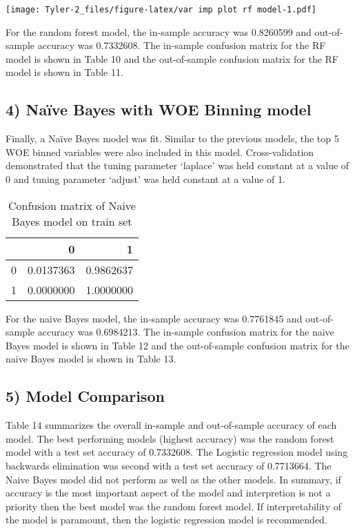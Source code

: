 \documentclass[12pt,]{article}
\begin{document}
\texttt{[image: Tyler-2\_files/figure-latex/var imp plot rf model-1.pdf]}

For the random forest model, the in-sample accuracy was 0.8260599 and
out-of-sample accuracy was 0.7332608. The in-sample confusion matrix for
the RF model is shown in Table 10 and the out-of-sample confusion matrix
for the RF model is shown in Table 11.

\pagebreak

\hypertarget{naive-bayes-with-woe-binning-model}{%
\subsection{4) Naïve Bayes with WOE Binning
model}\label{naive-bayes-with-woe-binning-model}}

Finally, a Naïve Bayes model was fit. Similar to the previous models,
the top 5 WOE binned variables were also included in this model.
Cross-validation demonstrated that the tuning parameter `laplace' was
held constant at a value of 0 and tuning parameter `adjust' was held
constant at a value of 1.

\begin{table}[t]

\caption{\label{tab:NB model conf matrix}Confusion matrix of Naive Bayes model on train set}
\centering
\begin{tabular}{lrr}
\toprule
  & 0 & 1\\
\midrule
\rowcolor{gray!6}  0 & 0.0137363 & 0.9862637\\
1 & 0.0000000 & 1.0000000\\
\bottomrule
\end{tabular}
\end{table}

For the naive Bayes model, the in-sample accuracy was 0.7761845 and
out-of-sample accuracy was 0.6984213. The in-sample confusion matrix for
the naive Bayes model is shown in Table 12 and the out-of-sample
confusion matrix for the naive Bayes model is shown in Table 13.

\pagebreak

\hypertarget{model-comparison}{%
\subsection{5) Model Comparison}\label{model-comparison}}

Table 14 summarizes the overall in-sample and out-of-sample accuracy of
each model. The best performing models (highest accuracy) was the random
forest model with a test set accuracy of 0.7332608. The Logistic
regression model using backwards elimination was second with a test set
accuracy of 0.7713664. The Naive Bayes model did not perform as well as
the other models. In summary, if accuracy is the most important aspect
of the model and interpretion is not a priority then the best model was
the random forest model. If interpretability of the model is paramount,
then the logistic regression model is recommended.
\end{document}
